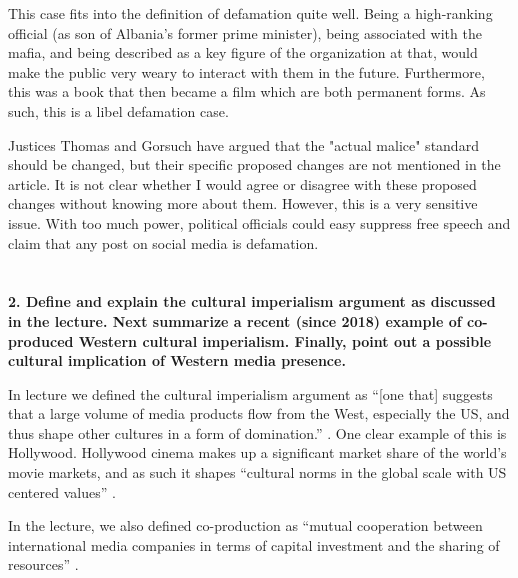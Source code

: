 \documentclass[a4paper]{article}
\begin{document}
        This case fits into the definition of defamation quite well. Being a high-ranking official (as son of Albania’s former 
        prime minister), being associated with the mafia, and being described as a key figure of the organization at that, would
        make the public very weary to interact with them in the future. Furthermore, this was a book that then became a film which 
        are both permanent forms. As such, this is a libel defamation case.
        
        Justices Thomas and Gorsuch have argued that the "actual malice" standard should be changed, but their specific proposed 
        changes are not mentioned in the article. It is not clear whether I would agree or disagree with these proposed changes 
        without knowing more about them. However, this is a very sensitive issue. With too much power, political officials could 
        easy suppress free speech and claim that any post on social media is defamation. 


    \section{}
        \textbf{2. Define and explain the cultural imperialism argument as discussed in the lecture. Next summarize a recent (since 2018) example of co-produced Western cultural imperialism. Finally, point out a possible cultural implication of Western media presence.}
        
        In lecture we defined the cultural imperialism argument as “[one that] suggests that a large volume of media products flow from 
        the West, especially the US, and thus shape other cultures in a form of domination.” \citep{lesson10}. One clear example of this 
        is Hollywood. Hollywood cinema makes up a significant market share of the world’s movie markets, and as such it shapes 
        “cultural norms in the global scale with US centered values” \citep{lesson10}. 
        
        In the lecture, we also defined co-production as “mutual cooperation between international media companies in terms of capital 
        investment and the sharing of resources” \citep{lesson10}. 
        
\end{document}
